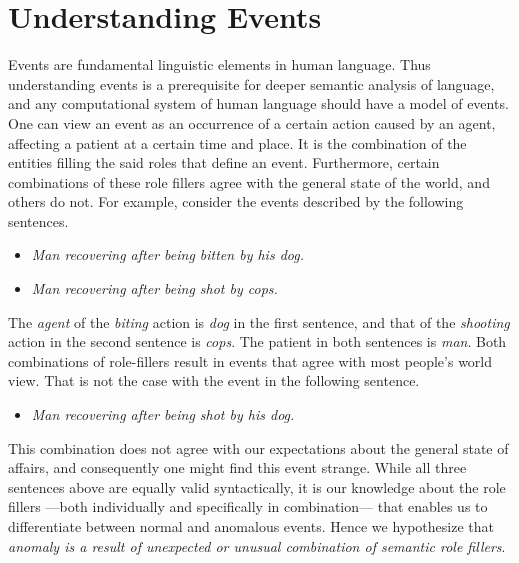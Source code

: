 \section{Understanding Events}
Events are fundamental linguistic elements in human language. Thus understanding 
events is a prerequisite for deeper semantic 
analysis of language, and any computational system of human language should
have a model of events. One can view an event as an occurrence of a certain 
action caused
by an agent, affecting a patient at a certain time and place. It is 
the combination of the entities
filling the said roles that define an event. Furthermore, certain combinations 
of these role fillers
agree with the general state of the world, and others do not. For example, 
consider the events described by the following
sentences.
\begin{itemize}
 \item[] \textit{Man recovering after being bitten by his dog.}
 \item[] \textit{Man recovering after being shot by cops.}
\end{itemize}
The \textit{agent} of the \textit{biting} action is \textit{dog} in the first 
sentence, and that of the \textit{shooting}
action in the second sentence is \textit{cops}. The patient in both sentences is 
\textit{man}.
Both combinations of role-fillers result in events that agree with most people's 
world view. That is not the case with
the event in the following sentence.
\begin{itemize}
 \item[] \textit{Man recovering after being shot by his dog.}
\end{itemize}
This combination does not agree with our expectations about the general state of 
affairs, and consequently one
might find this event strange. While all three sentences above are equally
valid syntactically, it 
is our knowledge about the role fillers 
---both individually and specifically in combination---  
that enables us to 
differentiate between normal and anomalous events.  Hence we hypothesize that
\emph{anomaly is a result of unexpected or 
unusual combination of semantic role fillers}.

